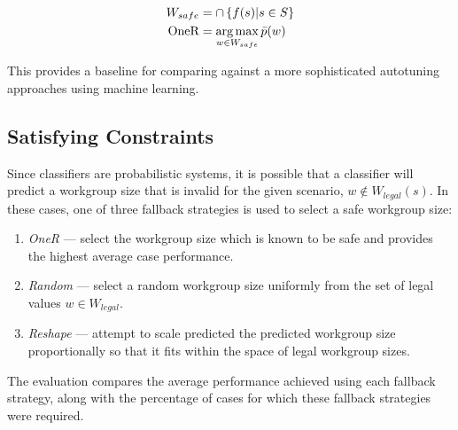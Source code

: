 \begin{align}
W_{safe} &= \cap \left\{ f(s) | s \in S \right\} \\
\text{OneR} &= \operatorname*{arg\,max}_{w \in W_{safe}} \bar{p}(w)
\end{align}

This provides a baseline for comparing against a more sophisticated
autotuning approaches using machine learning.

\subsection{Satisfying Constraints}

Since classifiers are probabilistic systems, it is possible that a
classifier will predict a workgroup size that is invalid for the given
scenario, $w \not\in W_{legal}(s)$. In these cases, one of three
fallback strategies is used to select a safe workgroup size:

\begin{enumerate}
\item \emph{OneR} --- select the workgroup size which is known to be
  safe and provides the highest average case performance.
\item \emph{Random} --- select a random workgroup size uniformly from
  the set of legal values $w \in W_{legal}$.
\item \emph{Reshape} --- attempt to scale predicted the predicted
  workgroup size proportionally so that it fits within the space of
  legal workgroup sizes.
\end{enumerate}

The evaluation compares the average performance achieved using each
fallback strategy, along with the percentage of cases for which these
fallback strategies were required.

